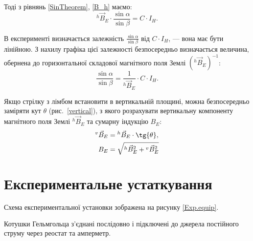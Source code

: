 Тоді з рівнянь \eqref{SinTheorem}, \eqref{B_h} %
маємо:
\begin{equation} \label{h_B_E}
     {}^{h}\vec{B}_{E} \cdot  \frac{\sin{\alpha}}{\sin{\beta}} = C \cdot I_{H}.
\end{equation}

В експерименті визначається залежність $\frac{\sin{\alpha}}{\sin{\beta}}$ від $C \cdot I_{H} $, --- вона має бути лінійною.
З нахилу графіка цієї залежності безпосередньо визначається
%
величина, обернена
до горизонтальної складової магнітного поля Землі
$({}^{h}\vec{B}_{E})^{-1}$:
%
\begin{equation} \label{fsin}
        \frac{\sin{\alpha}}{\sin{\beta}} = \frac{1}{{}^{h}\vec{B}_{E}} \cdot C \cdot I_{H}.
\end{equation}

Якщо стрілку з лімбом встановити в вертикальній площині, можна безпосередньо заміряти кут $\theta$ (рис.~\ref{vertical}), з якого розрахувати вертикальну компоненту магнітного поля Землі ${}^{h}\vec{B}_{E}$ та сумарну індукцію $B_{E}$:
\begin{align}\label{VerticalComp.MagneticFieldEarth}
    {}^{v}\vec{B}_{E} &=   {}^{h}\vec{B}_{E} \cdot \tg{\theta}, \\
     B_{E} &= \sqrt{ {}^{h}\vec{B}_{E}^2 + {}^{v}\vec{B}_{E}^2 }
\end{align}

\section{Експериментальне устаткування}
Схема експериментальної установки зображена на рисунку \ref{Exp.equip}.

Котушки Гельмгольца з'єднані послідовно і підключені до джерела постійного струму через реостат та амперметр.

